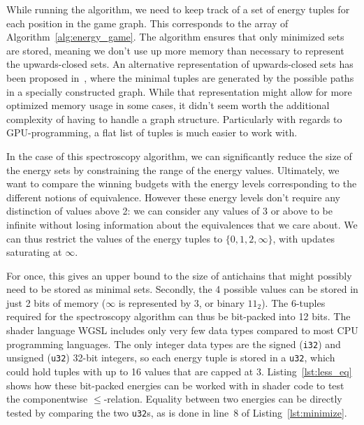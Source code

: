 While running the algorithm, we need to keep track of a set of energy tuples
for each position in the game graph.
This corresponds to the \Energies array of Algorithm~\ref{alg:energy_game}.
The algorithm ensures that only minimized sets are stored,
meaning we don't use up more memory than necessary to represent the
upwards-closed sets.
An alternative representation of upwards-closed sets has been proposed
in~\cite{Delzanno2000}, where the minimal tuples are generated by the possible
paths in a specially constructed graph.
While that representation might allow for more optimized memory usage in some cases,
it didn't seem worth the additional complexity of having to handle a graph structure.
Particularly with regards to GPU-programming, a flat list of tuples is much
easier to work with.

In the case of this spectroscopy algorithm, we can significantly reduce the
size of the energy sets by constraining the range of the energy values.
Ultimately, we want to compare the winning budgets with the energy levels
corresponding to the different notions of equivalence.
However these energy levels don't require any distinction of values above 2:
we can consider any values of 3 or above to be infinite without losing
information about the equivalences that we care about.
We can thus restrict the values of the energy tuples to $\{0, 1, 2, \infty\}$,
with updates saturating at $\infty$.

For once, this gives an upper bound to the size of antichains that might
possibly need to be stored as minimal sets.
Secondly, the 4 possible values can be stored in just 2 bits of memory
($\infty$ is represented by 3, or binary $11_2$).
The 6-tuples required for the spectroscopy algorithm can thus be bit-packed
into 12 bits.
The shader language WGSL includes only very few data types compared to most CPU
programming languages.
The only integer data types are the signed (\texttt{i32}) and unsigned
(\texttt{u32}) 32-bit integers,
so each energy tuple is stored in a \texttt{u32},
which could hold tuples with up to 16 values that are capped at 3.
Listing~\ref{lst:less_eq} shows how these bit-packed energies can
be worked with in shader code to test the componentwise $\leq$-relation.
Equality between two energies can be directly tested by comparing the two
\texttt{u32}s,
as is done in line~8 of Listing~\ref{lst:minimize}.

